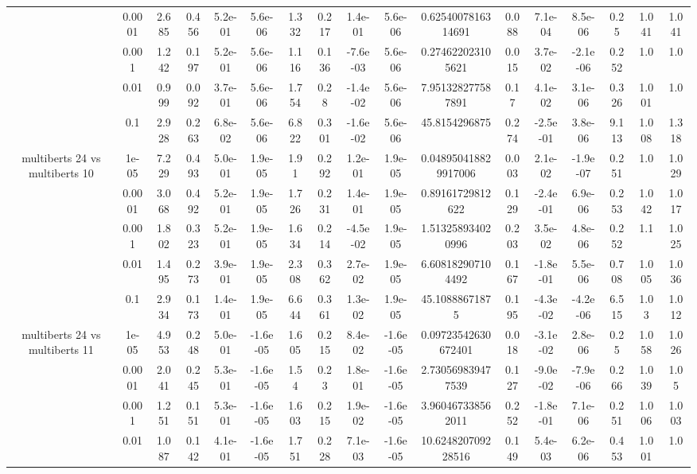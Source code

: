 \begin{tabular}{|c|c|c|c|c|c|c|c|c|c|c|c|c|c|c|c|c|}
 & 0.0001 & 2.685 & 0.456 & 5.2e-01 & 5.6e-06 & 1.332 & 0.217 & 1.4e-01 & 5.6e-06 & 0.6254007816314691 & 0.088 & 7.1e-04 & 8.5e-06 & 0.25 & 1.041 & 1.041 \\
 & 0.001 & 1.242 & 0.197 & 5.2e-01 & 5.6e-06 & 1.116 & 0.136 & -7.6e-03 & 5.6e-06 & 0.274622023105621 & 0.015 & 3.7e-02 & -2.1e-06 & 0.252 & 1.0 & 1.0 \\
 & 0.01 & 0.999 & 0.092 & 3.7e-01 & 5.6e-06 & 1.754 & 0.28 & -1.4e-02 & 5.6e-06 & 7.951328277587891 & 0.17 & 4.1e-02 & 3.1e-06 & 0.326 & 1.001 & 1.0 \\
 & 0.1 & 2.928 & 0.263 & 6.8e-02 & 5.6e-06 & 6.822 & 0.301 & -1.6e-02 & 5.6e-06 & 45.8154296875 & 0.274 & -2.5e-01 & 3.8e-06 & 9.113 & 1.008 & 1.318 \\
\hline
\multirow{5}{*}{multiberts 24 vs multiberts 10} & 1e-05 & 7.229 & 0.493 & 5.0e-01 & 1.9e-05 & 1.91 & 0.292 & 1.2e-01 & 1.9e-05 & 0.048950418829917006 & 0.003 & 2.1e-02 & -1.9e-07 & 0.251 & 1.0 & 1.029 \\
 & 0.0001 & 3.068 & 0.492 & 5.2e-01 & 1.9e-05 & 1.726 & 0.231 & 1.4e-01 & 1.9e-05 & 0.89161729812622 & 0.129 & -2.4e-01 & 6.9e-06 & 0.253 & 1.042 & 1.017 \\
 & 0.001 & 1.802 & 0.323 & 5.2e-01 & 1.9e-05 & 1.634 & 0.214 & -4.5e-02 & 1.9e-05 & 1.513258934020996 & 0.203 & 3.5e-02 & 4.8e-06 & 0.252 & 1.1 & 1.025 \\
 & 0.01 & 1.495 & 0.273 & 3.9e-01 & 1.9e-05 & 2.308 & 0.362 & 2.7e-02 & 1.9e-05 & 6.608182907104492 & 0.167 & -1.8e-01 & 5.5e-06 & 0.708 & 1.005 & 1.036 \\
 & 0.1 & 2.934 & 0.173 & 1.4e-01 & 1.9e-05 & 6.644 & 0.361 & 1.3e-02 & 1.9e-05 & 45.10888671875 & 0.195 & -4.3e-02 & -4.2e-06 & 6.515 & 1.03 & 1.012 \\
\hline
\multirow{5}{*}{multiberts 24 vs multiberts 11} & 1e-05 & 4.953 & 0.248 & 5.0e-01 & -1.6e-05 & 1.605 & 0.215 & 8.4e-02 & -1.6e-05 & 0.09723542630672401 & 0.018 & -3.1e-02 & 2.8e-06 & 0.25 & 1.058 & 1.026 \\
 & 0.0001 & 2.041 & 0.245 & 5.3e-01 & -1.6e-05 & 1.54 & 0.23 & 1.8e-01 & -1.6e-05 & 2.730569839477539 & 0.127 & -9.0e-02 & -7.9e-06 & 0.266 & 1.039 & 1.05 \\
 & 0.001 & 1.251 & 0.151 & 5.3e-01 & -1.6e-05 & 1.603 & 0.215 & 1.9e-02 & -1.6e-05 & 3.960467338562011 & 0.252 & -1.8e-01 & 7.1e-06 & 0.251 & 1.006 & 1.003 \\
 & 0.01 & 1.087 & 0.142 & 4.1e-01 & -1.6e-05 & 1.751 & 0.228 & 7.1e-03 & -1.6e-05 & 10.624820709228516 & 0.149 & 5.4e-03 & 6.2e-06 & 0.453 & 1.001 & 1.0 \\

\end{tabular}
